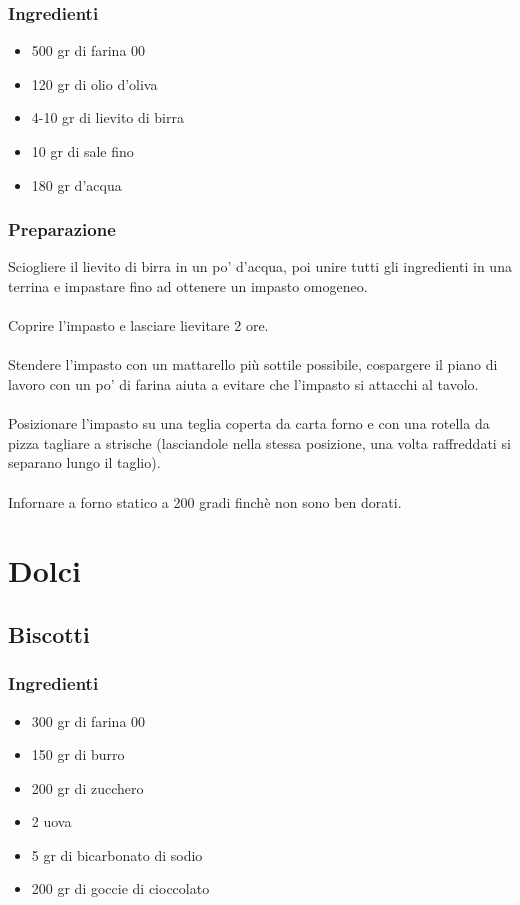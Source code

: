 \documentclass[12pt, a4paper]{article}
\begin{document}
\subsubsection{Ingredienti}
\begin{itemize}
\item	500 gr di farina 00
\item	120 gr di olio d'oliva
\item	4-10 gr di lievito di birra
\item	10 gr di sale fino
\item	180 gr d'acqua
\end{itemize}

\subsubsection{Preparazione}
	Sciogliere il lievito di birra in un po' d'acqua, poi unire tutti
	gli ingredienti in una terrina e impastare fino ad ottenere 
	un impasto omogeneo.\\\\
	Coprire l'impasto e lasciare lievitare 2 ore.\\\\
	Stendere l'impasto con un mattarello più sottile possibile,
	cospargere il piano di lavoro con un po' di farina aiuta a evitare
	che l'impasto si attacchi al tavolo.\\\\
	Posizionare l'impasto su una teglia coperta da carta forno e con
	una rotella da pizza tagliare a strische (lasciandole nella stessa
	posizione, una volta raffreddati si separano lungo il taglio).\\\\
	Infornare a forno statico a 200 gradi finchè non sono ben dorati.
\clearpage

\section{Dolci}

\subsection{Biscotti}

\subsubsection{Ingredienti}
\begin{itemize}
\item 300 gr di farina 00
\item	150 gr di burro
\item	200 gr di zucchero
\item	2 uova
\item	5 gr di bicarbonato di sodio
\item	200 gr di goccie di cioccolato
\end{itemize}
\end{document}
